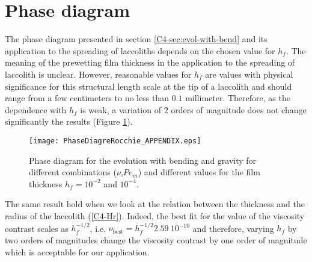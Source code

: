 \section{Phase diagram}

The phase diagram presented in section \ref{C4-sec:evol-with-bend} and
its application to  the spreading of laccoliths depends  on the chosen
value for $h_f$.  The meaning of  the prewetting film thickness in the
application  to  the  spreading  of laccolith  is  unclear.   However,
reasonable values for $h_f$ are  values with physical significance for
this structural  length scale  at the  tip of  a laccolith  and should
range  from  a few  centimeters  to  no  less than  $0.1$  millimeter.
Therefore, as  the dependence with $h_f$  is weak, a variation  of $2$
orders of magnitude does not  change significantly the results (Figure
\ref{C3-PhaseDiagramJFM_Appendix}).

\begin{figure}[h!]
  \begin{center}
    \graphicspath{ {/Users/thorey/Documents/These/Projet/Refroidissement/Skin_Model/Figure/Figure_Heating/} }
    \texttt{[image: PhaseDiagreRocchie\_APPENDIX.eps]}
    \caption{Phase diagram for the  evolution with bending and gravity
      for different  combinations ($\nu$,$Pe_m$) and  different values
      for the film thickness $h_f = 10^{-2}$ and $10^{-4}$.}
    \label{C3-PhaseDiagramJFM_Appendix}
  \end{center}
\end{figure}

The  same  result hold  when  we  look  at  the relation  between  the
thickness and the  radius of the laccolith  (\ref{C4-Hr}). Indeed, the
best  fit  for   the  value  of  the  viscosity   contrast  scales  as
$h_f^{-1/2}$,  i.e.   $\nu_{\text{best}}=h_f^{-1/2}2.59~10^{-10}$  and
therefore,  varying  $h_f$ by  two  orders  of magnitudes  change  the
viscosity contrast by  one order of magnitude which  is acceptable for
our application.



